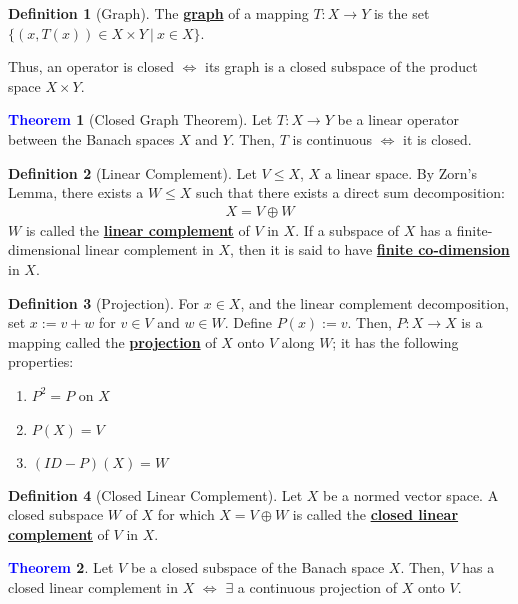 \documentclass[11pt]{article}
\theoremstyle{definition}
\theoremstyle{definition}
\newcommand{\dfn}[1]{\underline{\textbf{#1}}}
\newtheorem{theorem}{\textcolor{blue}{Theorem}}
\theoremstyle{definition}
\newtheorem{definition}{\textcolor{OliveGreen}{Definition}}
\theoremstyle{remark}
\begin{document}
\begin{definition}[Graph]
	The \dfn{graph} of a mapping $T: X \rightarrow Y$ is the set $\{ (x, T(x)) \in X \times Y\ |\ x \in X \}$. 
\end{definition}
Thus, an operator is closed $\iff$ its graph is a closed subspace of the product space $X \times Y$. 

\begin{theorem}[Closed Graph Theorem]
	Let $T: X \rightarrow Y$ be a linear operator between the Banach spaces $X$ and $Y$. Then, $T$ is continuous $\iff$ it is closed. 
\end{theorem}

\begin{definition}[Linear Complement]
	Let $V \leq X$, $X$ a linear space. By Zorn's Lemma, there exists a $W \leq X$ such that there exists a direct sum decomposition: 
	\begin{align}
		X = V \oplus W	
	\end{align}
	$W$ is called the \dfn{linear complement} of $V$ in $X$. If a subspace of $X$ has a finite-dimensional linear complement in $X$, then it is said to have \dfn{finite co-dimension} in $X$. 
\end{definition}

\begin{definition}[Projection]
	For $x \in X$, and the linear complement decomposition, set $x:= v + w$ for $v \in V$ and $w \in W$. Define $P(x) := v$. Then, $P: X \rightarrow X$ is a mapping called the \dfn{projection} of $X$ onto $V$ along $W$; it has the following properties: 
	\begin{enumerate}[noitemsep]
		\item $P^2 = P$ on $X$ 
		\item $P(X) = V$ 
		\item $(ID - P)(X) = W$
	\end{enumerate}
\end{definition}

\begin{definition}[Closed Linear Complement]
	Let $X$ be a normed vector space. A closed subspace $W$ of $X$ for which $X = V \oplus W$ is called the \dfn{closed linear complement} of $V$ in $X$. 
\end{definition}

\begin{theorem}
	Let $V$ be a closed subspace of the Banach space $X$. Then, $V$ has a closed linear complement in $X$ $\iff$ $\exists$ a continuous projection of $X$ onto $V$. 
\end{theorem}
\end{document}
